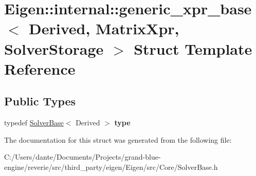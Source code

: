 \hypertarget{struct_eigen_1_1internal_1_1generic__xpr__base_3_01_derived_00_01_matrix_xpr_00_01_solver_storage_01_4}{}\section{Eigen\+::internal\+::generic\+\_\+xpr\+\_\+base$<$ Derived, Matrix\+Xpr, Solver\+Storage $>$ Struct Template Reference}
\label{struct_eigen_1_1internal_1_1generic__xpr__base_3_01_derived_00_01_matrix_xpr_00_01_solver_storage_01_4}
\subsection*{Public Types}
\begin{DoxyCompactItemize}
\item 
\mbox{\label{struct_eigen_1_1internal_1_1generic__xpr__base_3_01_derived_00_01_matrix_xpr_00_01_solver_storage_01_4_a5c1d5b4b360140ea61e91646bcee52c0}} 
typedef \mbox{\hyperlink{class_eigen_1_1_solver_base}{Solver\+Base}}$<$ Derived $>$ {\bfseries type}
\end{DoxyCompactItemize}


The documentation for this struct was generated from the following file\+:\begin{DoxyCompactItemize}
\item 
C\+:/\+Users/dante/\+Documents/\+Projects/grand-\/blue-\/engine/reverie/src/third\+\_\+party/eigen/\+Eigen/src/\+Core/Solver\+Base.\+h\end{DoxyCompactItemize}
